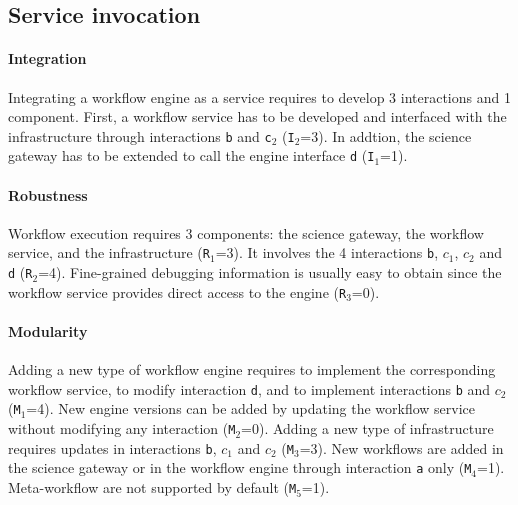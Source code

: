 \documentclass[preprint,3p,twocolumn]{elsarticle}
\begin{document}
\subsection{Service invocation} 

\paragraph{Integration} Integrating a workflow engine as a service
requires to develop 3 interactions and 1 component. First, a workflow
service has to be developed and interfaced with the infrastructure
through interactions \texttt{b} and \texttt{c$_2$}
(\texttt{I$_2$}=3). In addtion, the science gateway has to be extended
to call the engine interface \texttt{d} (\texttt{I$_1$}=1).

\paragraph{Robustness} Workflow execution requires 3 components: the
science gateway, the workflow service, and the infrastructure
(\texttt{R$_1$}=3). It involves the 4 interactions \texttt{b},
\texttt{$c_1$}, \texttt{$c_2$} and \texttt{d}
(\texttt{R$_2$}=4). Fine-grained debugging information is usually easy
to obtain since the workflow service provides direct access to the
engine (\texttt{R$_3$}=0).

\paragraph{Modularity} Adding a new type of workflow engine requires
to implement the corresponding workflow service, to modify interaction
\texttt{d}, and to implement interactions \texttt{b} and
\texttt{$c_2$} (\texttt{M$_1$}=4). New engine versions can be added by
updating the workflow service without modifying any interaction
(\texttt{M$_2$}=0). Adding a new type of infrastructure requires
updates in interactions \texttt{b}, \texttt{$c_1$} and \texttt{$c_2$}
(\texttt{M$_3$}=3). New workflows are added in the science gateway or
in the workflow engine through interaction \texttt{a} only
(\texttt{M$_4$}=1). Meta-workflow are not supported by default
(\texttt{M$_5$}=1).
\end{document}
